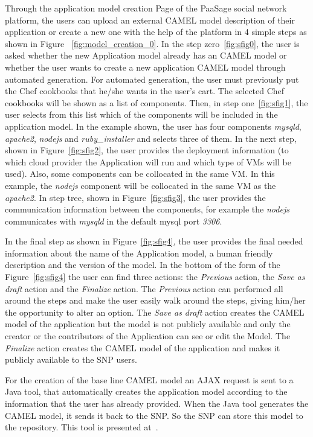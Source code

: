 Through the application model creation Page of the PaaSage social network platform, the users can upload an external CAMEL model description of their application or create a new one with the help of the platform in 4 simple steps as shown in Figure ~\ref{fig:model_creation_0}. In the step zero~\ref{fig:sfig0}, the user is asked whether the new Application model already has an CAMEL model or whether the user wants to create a new application CAMEL model through automated generation. For automated generation, the user must previously put the Chef cookbooks that he/she wants in the user's cart. The selected Chef cookbooks will be shown as a list of components. Then, in step one~\ref{fig:sfig1}, the user selects from this list which of the components will be included in the application model. 
In the example shown, the user has four components {\it mysqld}, {\it apache2}, {\it nodejs} and 
{\it ruby\_installer} and selects three of them. In the next step, shown in Figure~\ref{fig:sfig2}, the user provides the deployment information (to which cloud provider the Application will run and which type of VMs will be used). Also, some components can be collocated in the same VM. In this example, the {\it nodejs} component will be collocated in the same VM as the {\it apache2}. In step tree, shown in Figure~\ref{fig:sfig3}, the user provides the communication information between the components, for example the 
{\it nodejs} communicates with {\it mysqld} in the default mysql port {\it 3306}.

In the final step as shown in Figure~\ref{fig:sfig4}, the user provides the final needed information about the name of the Application model, a human friendly description and the version of the model. In the bottom of the form of the Figure~\ref{fig:sfig4} the user can find three actions: the \emph{Previous} action, the \emph{Save as draft} action and the \emph{Finalize} action. The \emph{Previous} action can performed all around the steps and make the user easily walk around the steps, giving him/her the opportunity to alter an option. The \emph{Save as draft} action creates the CAMEL model of the application but the model is not publicly available and only the creator or the contributors of the Application can see or edit the Model. The \emph{Finalize} action creates the CAMEL model of the application and makes it publicly available to the SNP users. 

For the creation of the base line CAMEL model an AJAX request is sent to a Java tool, that automatically creates the application model according to the information that the user has already provided. When the Java tool generates the CAMEL model, it sends it back to the SNP. So the SNP can store this model to the repository. This tool is presented at~\cite{papoutsakis2014reducing}. 

